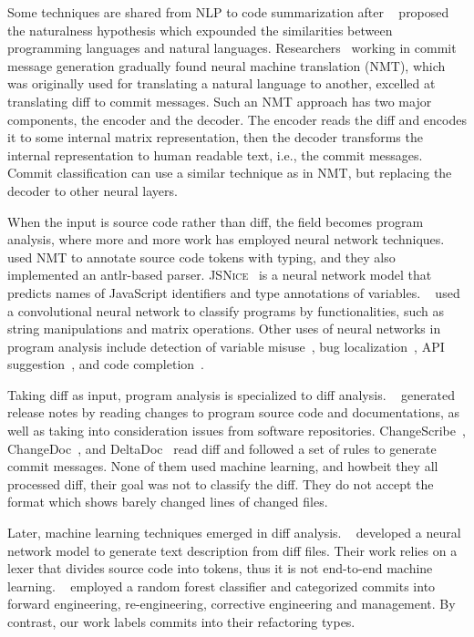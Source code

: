 Some techniques are shared from NLP to code summarization after ~\cite{allamanis2018survey} proposed the naturalness hypothesis which expounded the similarities between programming languages and natural languages.
Researchers~\cite{xu2019commit,liu2019generating} working in commit message generation gradually found neural machine translation (NMT),
which was originally used for translating a natural language to another,
excelled at translating diff to commit messages.
Such an NMT approach has two major components, the encoder and the decoder.
The encoder reads the diff and encodes it to some internal matrix representation,
then the decoder transforms the internal representation to human readable text, i.e., the commit messages.
Commit classification can use a similar technique as in NMT,
but replacing the decoder to other neural layers.

When the input is source code rather than diff,
the field becomes program analysis, where more and more work has employed neural network techniques.
~\cite{alexandru2017replicating} used NMT to annotate source code tokens with typing,
and they also implemented an {\sc antlr}-based parser.
\textsc{JSNice}~\cite{raychev2015predicting} is a neural network model that predicts names of JavaScript identifiers and type annotations of variables.
~\cite{mou2016convolutional} used a convolutional neural network to classify programs by functionalities, such as string manipulations and matrix operations.
Other uses of neural networks in program analysis include
detection of variable misuse~\cite{morgachev2019detection},
bug localization~\cite{huo2016learning},
API suggestion~\cite{gu2016deep}, and
code completion~\cite{raychev2014code}.

Taking diff as input, program analysis is specialized to diff analysis.
~\cite{moreno2016arena} generated release notes by reading changes to program source code and documentations, as well as taking into consideration issues from software repositories.
ChangeScribe~\cite{linares2015changescribe},
ChangeDoc~\cite{huang2020learning}, and
DeltaDoc~\cite{buse2010automatically} read diff and followed a set of rules to generate commit messages.
None of them used machine learning, and howbeit they all processed diff,
their goal was not to classify the diff.
They do not accept the {\gitdiff} format which shows barely changed lines of changed files.

Later, machine learning techniques emerged in diff analysis.
~\cite{loyola2017neural} developed a neural network model to generate text description from diff files.
Their work relies on a lexer that divides source code into tokens,
thus it is not end-to-end machine learning.
~\cite{macho2016predicting} employed a random forest classifier and categorized commits into forward engineering, re-engineering, corrective engineering and management.
By contrast, our work labels commits into their refactoring types.








